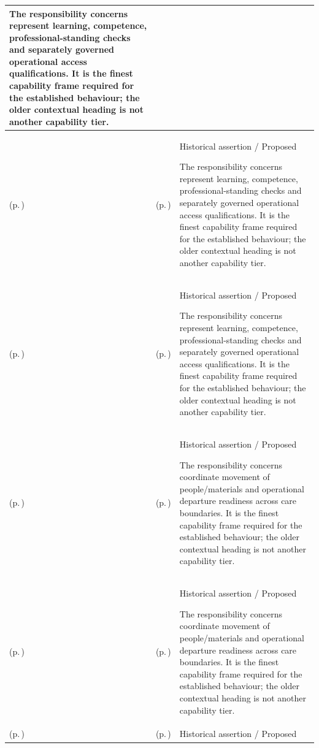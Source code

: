 \begin{longtable}{|>{\raggedright\arraybackslash}p{0.27\TableWidth}|>{\raggedright\arraybackslash}p{0.27\TableWidth}|>{\raggedright\arraybackslash}p{0.46\TableWidth}|}
The responsibility concerns represent learning, competence, professional-standing checks and separately governed operational access qualifications. It is the finest capability frame required for the established behaviour; the older contextual heading is not another capability tier.\\\hline
\nameref{cap:bec-workforce-qualification-development-enablement} (p.\,\pageref{cap:bec-workforce-qualification-development-enablement}) & \nameref{cap:bec-clinical-qualification-management} (p.\,\pageref{cap:bec-clinical-qualification-management}) & Historical assertion / Proposed

The responsibility concerns represent learning, competence, professional-standing checks and separately governed operational access qualifications. It is the finest capability frame required for the established behaviour; the older contextual heading is not another capability tier.\\\hline
\nameref{cap:bec-workforce-qualification-development-enablement} (p.\,\pageref{cap:bec-workforce-qualification-development-enablement}) & \nameref{cap:bec-clinical-supervision} (p.\,\pageref{cap:bec-clinical-supervision}) & Historical assertion / Proposed

The responsibility concerns represent learning, competence, professional-standing checks and separately governed operational access qualifications. It is the finest capability frame required for the established behaviour; the older contextual heading is not another capability tier.\\\hline
\nameref{cap:bec-care-movement-transition-coordination} (p.\,\pageref{cap:bec-care-movement-transition-coordination}) & \nameref{cap:bec-patient-transport} (p.\,\pageref{cap:bec-patient-transport}) & Historical assertion / Proposed

The responsibility concerns coordinate movement of people/materials and operational departure readiness across care boundaries. It is the finest capability frame required for the established behaviour; the older contextual heading is not another capability tier.\\\hline
\nameref{cap:bec-care-movement-transition-coordination} (p.\,\pageref{cap:bec-care-movement-transition-coordination}) & \nameref{cap:bec-clinical-logistics-coordination} (p.\,\pageref{cap:bec-clinical-logistics-coordination}) & Historical assertion / Proposed

The responsibility concerns coordinate movement of people/materials and operational departure readiness across care boundaries. It is the finest capability frame required for the established behaviour; the older contextual heading is not another capability tier.\\\hline
\nameref{cap:bec-care-movement-transition-coordination} (p.\,\pageref{cap:bec-care-movement-transition-coordination}) & \nameref{cap:bec-discharge-management} (p.\,\pageref{cap:bec-discharge-management}) & Historical assertion / Proposed


\end{longtable}
